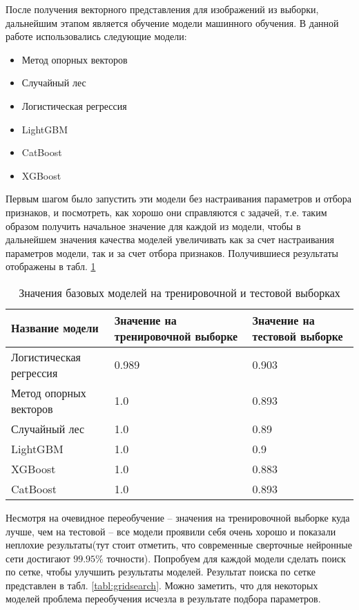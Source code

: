 После получения векторного представления для изображений из выборки, дальнейшим этапом является обучение модели машинного обучения. В данной работе использовались следующие модели:
\begin{itemize}
	\item Метод опорных векторов
	\item Случайный лес
	\item Логистическая регрессия
	\item LightGBM
	\item CatBoost
	\item XGBoost
\end{itemize}
Первым шагом было запустить эти модели без настраивания параметров и отбора признаков, и посмотреть, как хорошо они справляются с задачей, т.е. таким образом получить начальное значение для каждой из модели, чтобы в дальнейшем значения качества моделей увеличивать как за счет настраивания параметров модели, так и за счет отбора признаков. Получившиеся результаты отображены в табл. \ref{tabl:baselines}

\begin{table}[!htbp]
	\centering
	\small
	\begin{tabularx}{\linewidth}{|X|X|X|}
		\hline
		Название модели & Значение на тренировочной выборке & Значение на тестовой выборке\\ \hline
		Логистическая регрессия & 0.989 & 0.903 \\
		\hline 
		Метод опорных векторов & 1.0 & 0.893 \\
		\hline
		Случайный лес & 1.0 & 0.89 \\
		\hline
		LightGBM & 1.0 & 0.9 \\
		\hline
		XGBoost & 1.0 & 0.883 \\
		\hline
		CatBoost & 1.0 & 0.893 \\ 
		\hline
	\end{tabularx}
	\caption{Значения базовых моделей на тренировочной и тестовой выборках}	
	\label{tabl:baselines}
\end{table}

Несмотря на очевидное переобучение -- значения на тренировочной выборке куда лучше, чем на тестовой -- все модели проявили себя очень хорошо и показали неплохие результаты(тут стоит отметить, что современные сверточные нейронные сети достигают $99.95\%$ точности). Попробуем для каждой модели сделать поиск по сетке, чтобы улучшить результаты моделей. Результат поиска по сетке представлен в табл. \ref{tabl:gridsearch}. Можно заметить, что для некоторых моделей проблема переобучения исчезла в результате подбора параметров.

